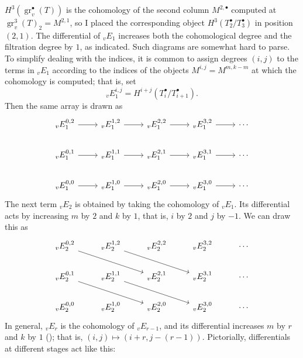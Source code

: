 $H^3(\operatorname{gr}_v^\bullet(T))$ is the cohomology of the second
column $M^{2,\bullet}$ computed at
$\operatorname{gr}_v^3(T)_2 = M^{2,1}$, so I placed the corresponding
object $H^3(T_2^\bullet/T_3^\bullet)$ in position $(2,1)$. The
differential of ${}_vE_1$ increases both the cohomological degree and
the filtration degree by $1$, as indicated. Such diagrams are somewhat
hard to parse. To simplify dealing with the indices, it is common to
assign degrees $(i,j)$ to the terms in ${}_vE_1$ according to the
indices of the objects $M^{i,j} = M^{m,k-m}$ at which the cohomology
is computed; that is, set
\[ {}_vE_1^{i,j} = H^{i+j}(T_i^\bullet/T_{i+1}^\bullet).
\]
Then the same array is drawn as
\[\begin{tikzcd}
    {}_vE_1^{0,2} \arrow[r] & {}_vE_1^{1,2} \arrow[r] & {}_vE_1^{2,2} \arrow[r] & {}_vE_1^{3,2} \arrow[r] & \cdots \\
    {}_vE_1^{0,1} \arrow[r] & {}_vE_1^{1,1} \arrow[r] & {}_vE_1^{2,1} \arrow[r] & {}_vE_1^{3,1} \arrow[r] & \cdots \\
    {}_vE_1^{0,0} \arrow[r] & {}_vE_1^{1,0} \arrow[r] & {}_vE_1^{2,0}
    \arrow[r] & {}_vE_1^{3,0} \arrow[r] & \cdots
  \end{tikzcd}\] The next term ${}_vE_2$ is obtained by taking the
cohomology of ${}_vE_1$. Its differential acts by increasing $m$ by
$2$ and $k$ by $1$, that is, $i$ by $2$ and $j$ by $-1$. We can draw
this as
\[\begin{tikzcd}
    {}_vE_2^{0,2} \arrow[drr] & {}_vE_2^{1,2} \arrow[drr] & {}_vE_2^{2,2} & {}_vE_2^{3,2} & \cdots \\
    {}_vE_2^{0,1} \arrow[drr] & {}_vE_2^{1,1} \arrow[drr] & {}_vE_2^{2,1} & {}_vE_2^{3,1} & \cdots \\
    {}_vE_2^{0,0} & {}_vE_2^{1,0} & {}_vE_2^{2,0} & {}_vE_2^{3,0} &
    \cdots
  \end{tikzcd}\] In general, ${}_vE_r$ is the cohomology of
${}_vE_{r-1}$, and its differential increases $m$ by $r$ and $k$ by
$1$ (); that is, $(i,j) \mapsto (i+r, j-(r-1))$.
Pictorially, differentials at different stages act like this:
